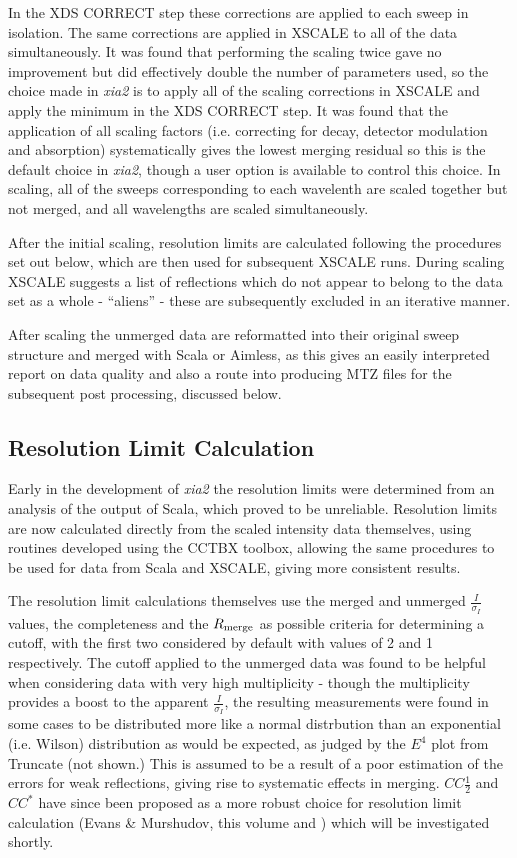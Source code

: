 \documentclass[preprint,pdf]{iucr}
\begin{document}
In the XDS CORRECT step these corrections are applied to each sweep in
isolation. The same corrections are applied in XSCALE to all of the
data simultaneously. It was found that performing the scaling twice
gave no improvement but did effectively double the number of
parameters used, so the choice made in \emph{xia2} is to apply all of
the scaling corrections in XSCALE and apply the minimum in the XDS
CORRECT step. It was found that the application of all scaling factors
(i.e. correcting for decay, detector modulation and absorption)
systematically gives the lowest merging residual so this is the
default choice in \emph{xia2}, though a user option is available to
control this choice. In scaling, all of the sweeps corresponding to
each wavelenth are scaled together but not merged, and
all wavelengths are scaled simultaneously. 

After the initial scaling, resolution limits are calculated
following the procedures set out below, which are then used for subsequent
XSCALE runs. During scaling XSCALE suggests a
list of reflections which do not appear to belong to the data set as a
whole - ``aliens'' - these are subsequently excluded in an iterative manner.

After scaling the unmerged data are reformatted into their original
sweep structure and merged with Scala or Aimless, as this gives an
easily interpreted report on data quality and also a route into
producing MTZ files for the subsequent post processing, discussed below.

\subsection{Resolution Limit Calculation}

Early in the development of \emph{xia2} the resolution limits were
determined from an analysis of the output of Scala, which proved to be
unreliable. Resolution limits are now calculated directly from the
scaled intensity data themselves, using routines developed using
the CCTBX toolbox, allowing the same procedures to be used for data from Scala
and XSCALE, giving more consistent results.

The resolution limit calculations themselves use the merged and
unmerged $\frac{I}{\sigma_I}$ values, the completeness and the
$R_{\rm{merge}}$ as possible criteria for determining a cutoff, with
the first two considered by default with values of 2 and 1
respectively. The cutoff applied to the unmerged data was found to be
helpful when considering data with very high multiplicity - though the
multiplicity provides a boost to the apparent $\frac{I}{\sigma_I}$,
the resulting measurements were found in some cases
to be distributed more like a
normal distrbution than an exponential (i.e. Wilson) distribution as
would be
expected, as judged by the $E^4$ plot from Truncate (not shown.)
This is assumed
to be a result of a poor estimation of the errors for weak
reflections, giving rise to systematic effects in
merging. $CC\frac{1}{2}$ and $CC^*$
have since been proposed as a more robust
choice for resolution limit calculation (Evans \& Murshudov, this
volume and \cite{Karplus25052012})
which will be investigated shortly.
\end{document}
